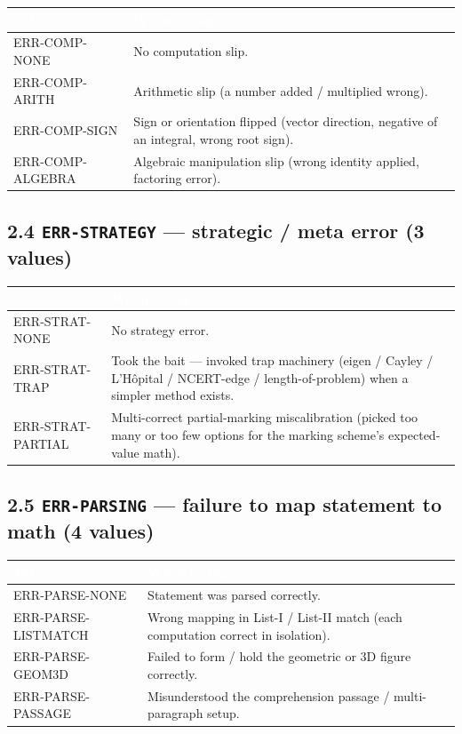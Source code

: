 \documentclass[11pt,letterpaper]{article}
\newcommand{\cd}[1]{\texttt{\small #1}}
\begin{document}
\begin{tabular}{|p{3cm}|p{12.5cm}|}
\hline
\rowcolor{headergray}\textcolor{white}{\textbf{Value}} & \textcolor{white}{\textbf{When to tag}} \\
\hline
ERR-COMP-NONE & No computation slip. \\
\rowcolor{altrow}ERR-COMP-ARITH & Arithmetic slip (a number added / multiplied wrong). \\
ERR-COMP-SIGN & Sign or orientation flipped (vector direction, negative of an integral, wrong root sign). \\
\rowcolor{altrow}ERR-COMP-ALGEBRA & Algebraic manipulation slip (wrong identity applied, factoring error). \\
\hline
\end{tabular}

\subsection*{2.4 \cd{ERR-STRATEGY} --- strategic / meta error (3 values)}

\begin{tabular}{|p{3cm}|p{12.5cm}|}
\hline
\rowcolor{headergray}\textcolor{white}{\textbf{Value}} & \textcolor{white}{\textbf{When to tag}} \\
\hline
ERR-STRAT-NONE & No strategy error. \\
\rowcolor{altrow}ERR-STRAT-TRAP & Took the bait --- invoked trap machinery (eigen / Cayley / L'H\^opital / NCERT-edge / length-of-problem) when a simpler method exists. \\
ERR-STRAT-PARTIAL & Multi-correct partial-marking miscalibration (picked too many or too few options for the marking scheme's expected-value math). \\
\hline
\end{tabular}

\subsection*{2.5 \cd{ERR-PARSING} --- failure to map statement to math (4 values)}

\begin{tabular}{|p{3cm}|p{12.5cm}|}
\hline
\rowcolor{headergray}\textcolor{white}{\textbf{Value}} & \textcolor{white}{\textbf{When to tag}} \\
\hline
ERR-PARSE-NONE & Statement was parsed correctly. \\
\rowcolor{altrow}ERR-PARSE-LISTMATCH & Wrong mapping in List-I / List-II match (each computation correct in isolation). \\
ERR-PARSE-GEOM3D & Failed to form / hold the geometric or 3D figure correctly. \\
\rowcolor{altrow}ERR-PARSE-PASSAGE & Misunderstood the comprehension passage / multi-paragraph setup. \\
\hline
\end{tabular}
\end{document}
